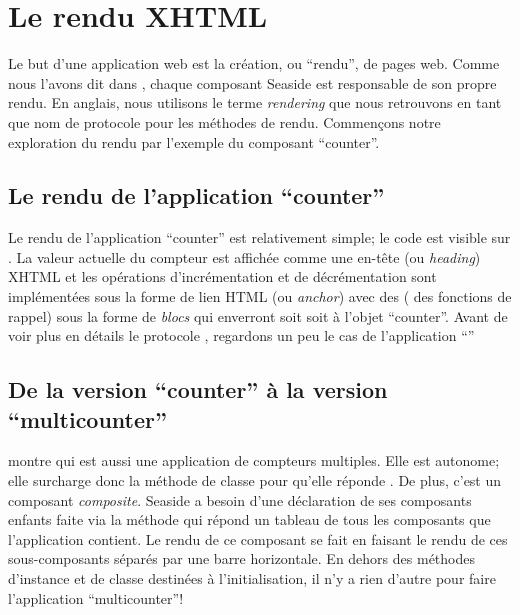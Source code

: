 \documentclass[a4paper,10pt,twoside]{book}
\begin{document}
\section{Le rendu XHTML}

Le but d'une application web est la création, ou ``rendu'', de pages web.
Comme nous l'avons dit dans , chaque composant
Seaside est responsable de son propre rendu.
En anglais, nous utilisons le terme \emph{rendering} que nous
retrouvons en tant que nom de protocole pour les méthodes de rendu.
Commençons notre exploration du rendu par l'exemple du composant ``counter''.

\subsection{Le rendu de l'application ``counter''}

Le rendu de l'application ``counter'' est relativement simple; le code
est visible sur .
La valeur actuelle du compteur est affichée comme une en-tête (ou
\emph{heading}) XHTML et les opérations d'incrémentation et de
décrémentation sont implémentées sous la forme de lien HTML (ou
\emph{anchor}) avec des \callbacks (\ie{} des fonctions
de rappel) sous la forme de \emph{blocs} qui enverront soit
 soit  à l'objet ``counter''.
Avant de voir plus en détails le protocole , regardons
un peu le cas de l'application ``''

\subsection{De la version ``counter'' à la version ``multicounter''}

 montre  qui est
aussi une application
de compteurs multiples. Elle est autonome; elle surcharge donc la méthode de
classe  pour qu'elle réponde
.
De plus, c'est un composant \emph{composite}. Seaside a besoin d'une
déclaration de ses composants enfants faite via la méthode
 qui répond un tableau de tous les composants que
l'application contient.
Le rendu de ce composant se fait en faisant le rendu de ces
sous-composants séparés par une barre horizontale.
En dehors des méthodes d'instance et de classe destinées à
l'initialisation, il n'y a rien d'autre pour faire l'application
``multicounter''!
\end{document}
